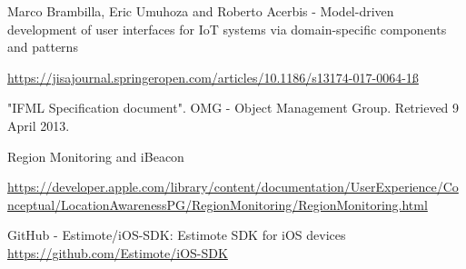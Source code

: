 

\begin{thebibliography}{90}

Marco Brambilla, Eric Umuhoza and Roberto Acerbis - Model-driven development of user interfaces for IoT systems via domain-specific components and patterns

\url{https://jisajournal.springeropen.com/articles/10.1186/s13174-017-0064-1ß}
    
"IFML Specification document". OMG - Object Management Group. Retrieved 9 April 2013.

Region Monitoring and iBeacon

\url{https://developer.apple.com/library/content/documentation/UserExperience/Conceptual/LocationAwarenessPG/RegionMonitoring/RegionMonitoring.html}
    
GitHub - Estimote/iOS-SDK: Estimote SDK for iOS devices
\url{https://github.com/Estimote/iOS-SDK}
\end{thebibliography}


